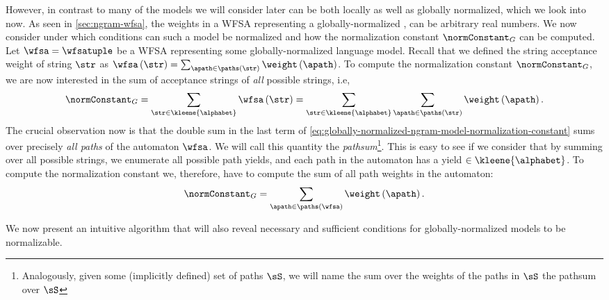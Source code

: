 However, in contrast to many of the models we will consider later can \ngram{} be both locally as well as globally normalized, which we look into now. 
As seen in \cref{sec:ngram-wfsa}, the weights in a WFSA representing a globally-normalized \ngram{}, can be arbitrary real numbers.
We now consider under which conditions can such a model be normalized and how the normalization constant $\normConstant_G$ can be computed.
Let $\wfsa=\wfsatuple$ be a WFSA representing some \ngram{} globally-normalized language model.
Recall that we defined the string acceptance weight of string $\str$ as $\wfsa\left(\str\right) = \sum_{\apath \in \paths\left( \str \right) }  \weight \left( \apath \right)$.
To compute the normalization constant $\normConstant_G$, we are now interested in the sum of acceptance strings of \emph{all} possible strings, i.e, 
\begin{equation}\label{eq:globally-normalized-ngram-model-normalization-constant}
    \normConstant_G = \sum_{\str \in \kleene{\alphabet}} \wfsa\left(\str\right) = \sum_{\str \in \kleene{\alphabet}} \sum_{\apath \in \paths\left( \str \right) }  \weight \left( \apath \right).
\end{equation}
The crucial observation now is that the double sum in the last term of \cref{eq:globally-normalized-ngram-model-normalization-constant} sums over precisely \emph{all paths} of the automaton $\wfsa$.
We will call this quantity the \emph{pathsum}\footnote{Analogously, given some (implicitly defined) set of paths $\sS$, we will name the sum over the weights of the paths in $\sS$ the pathsum over $\sS$}.
This is easy to see if we consider that by summing over all possible strings, we enumerate all possible path yields, and each path in the automaton has a yield $\in \kleene{\alphabet}$.
To compute the normalization constant we, therefore, have to compute the sum of all path weights in the automaton:
\begin{equation}
    \normConstant_G = \sum_{\apath \in \paths\left( \wfsa \right) }  \weight \left( \apath \right).
\end{equation}

We now present an intuitive algorithm that will also reveal necessary and sufficient conditions for globally-normalized \ngram{} models to be normalizable.

